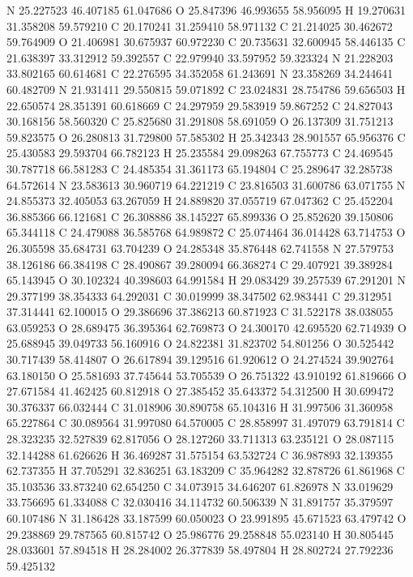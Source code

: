 \documentclass{article}
\begin{document}
N 25.227523 46.407185 61.047686
O 25.847396 46.993655 58.956095
H 19.270631 31.358208 59.579210
C 20.170241 31.259410 58.971132
C 21.214025 30.462672 59.764909
O 21.406981 30.675937 60.972230
C 20.735631 32.600945 58.446135
C 21.638397 33.312912 59.392557
C 22.979940 33.597952 59.323324
N 21.228203 33.802165 60.614681
C 22.276595 34.352058 61.243691
N 23.358269 34.244641 60.482709
N 21.931411 29.550815 59.071892
C 23.024831 28.754786 59.656503
H 22.650574 28.351391 60.618669
C 24.297959 29.583919 59.867252
C 24.827043 30.168156 58.560320
C 25.825680 31.291808 58.691059
O 26.137309 31.751213 59.823575
O 26.280813 31.729800 57.585302
H 25.342343 28.901557 65.956376
C 25.430583 29.593704 66.782123
H 25.235584 29.098263 67.755773
C 24.469545 30.787718 66.581283
C 24.485354 31.361173 65.194804
C 25.289647 32.285738 64.572614
N 23.583613 30.960719 64.221219
C 23.816503 31.600786 63.071755
N 24.855373 32.405053 63.267059
H 24.889820 37.055719 67.047362
C 25.452204 36.885366 66.121681
C 26.308886 38.145227 65.899336
O 25.852620 39.150806 65.344118
C 24.479088 36.585768 64.989872
C 25.074464 36.014428 63.714753
O 26.305598 35.684731 63.704239
O 24.285348 35.876448 62.741558
N 27.579753 38.126186 66.384198
C 28.490867 39.280094 66.368274
C 29.407921 39.389284 65.143945
O 30.102324 40.398603 64.991584
H 29.083429 39.257539 67.291201
N 29.377199 38.354333 64.292031
C 30.019999 38.347502 62.983441
C 29.312951 37.314441 62.100015
O 29.386696 37.386213 60.871923
C 31.522178 38.038055 63.059253
O 28.689475 36.395364 62.769873
O 24.300170 42.695520 62.714939
O 25.688945 39.049733 56.160916
O 24.822381 31.823702 54.801256
O 30.525442 30.717439 58.414807
O 26.617894 39.129516 61.920612
O 24.274524 39.902764 63.180150
O 25.581693 37.745644 53.705539
O 26.751322 43.910192 61.819666
O 27.671584 41.462425 60.812918
O 27.385452 35.643372 54.312500
H 30.699472 30.376337 66.032444
C 31.018906 30.890758 65.104316
H 31.997506 31.360958 65.227864
C 30.089564 31.997080 64.570005
C 28.858997 31.497079 63.791814
C 28.323235 32.527839 62.817056
O 28.127260 33.711313 63.235121
O 28.087115 32.144288 61.626626
H 36.469287 31.575154 63.532724
C 36.987893 32.139355 62.737355
H 37.705291 32.836251 63.183209
C 35.964282 32.878726 61.861968
C 35.103536 33.873240 62.654250
C 34.073915 34.646207 61.826978
N 33.019629 33.756695 61.334088
C 32.030416 34.114732 60.506339
N 31.891757 35.379597 60.107486
N 31.186428 33.187599 60.050023
O 23.991895 45.671523 63.479742
O 29.238869 29.787565 60.815742
O 25.986776 29.258848 55.023140
H 30.805445 28.033601 57.894518
H 28.284002 26.377839 58.497804
H 28.802724 27.792236 59.425132
\end{document}
